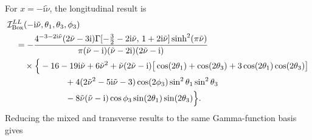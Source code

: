 \documentclass[a4paper,12pt]{article}
\def\ii{\mathrm{i}}
\begin{document}
For $x=-\ii\tilde\nu$, the longitudinal result is
\begin{align}
    &\mathcal I^{LL}_{\mathrm{Box}}
    (-\ii\tilde\nu,\theta_1,\theta_3,\phi_3)
    \nonumber\\
    &\quad=-\frac{4^{-3-2\ii\tilde\nu}(2\tilde\nu-3\ii)
    \Gamma[-\tfrac32-2\ii\tilde\nu,\,1+2\ii\tilde\nu]
    \sinh^2(\pi\tilde\nu)}
    {\pi(\tilde\nu-\ii)(\tilde\nu-2\ii)(2\tilde\nu-\ii)}
    \nonumber\\
    &\qquad\times\Big\{
    -16-19\ii\tilde\nu+6\tilde\nu^2
    +\tilde\nu(2\tilde\nu-\ii)
    \big[\cos(2\theta_1)+\cos(2\theta_3)
    +3\cos(2\theta_1)\cos(2\theta_3)\big]
    \nonumber\\
    &\hspace{24mm}
    +4(2\tilde\nu^2-5\ii\tilde\nu-3)
    \cos(2\phi_3)\sin^2\theta_1\sin^2\theta_3
    \nonumber\\
    &\hspace{24mm}
    -8\tilde\nu(\tilde\nu-\ii)\cos\phi_3
    \sin(2\theta_1)\sin(2\theta_3)\Big\}.
    \label{eq:box-ILL-closed}
\end{align}
Reducing the mixed and transverse results to the same Gamma-function basis gives
\end{document}
